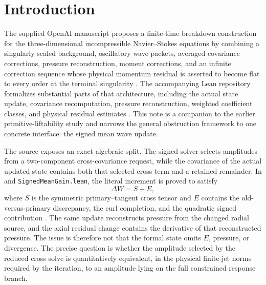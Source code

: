 \documentclass[12pt]{article}
\theoremstyle{plain}
\theoremstyle{definition}
\theoremstyle{remark}
\begin{document}
\tableofcontents
\newpage

\section{Introduction}\label{sec:introduction}
The supplied OpenAI manuscript proposes a finite-time breakdown construction for the three-dimensional incompressible Navier--Stokes equations by combining a singularly scaled background, oscillatory wave packets, averaged covariance corrections, pressure reconstruction, moment corrections, and an infinite correction sequence whose physical momentum residual is asserted to become flat to every order at the terminal singularity \cite[Secs.~3--10]{OpenAI2026}. The accompanying Lean repository formalizes substantial parts of that architecture, including the actual state update, covariance recomputation, pressure reconstruction, weighted coefficient classes, and physical residual estimates \cite{OpenAILeanRepo2026}. This note is a companion to the earlier primitive-liftability study and narrows the general obstruction framework to one concrete interface: the signed mean wave update.

The source exposes an exact algebraic split. The signed solver selects amplitudes from a two-component cross-covariance request, while the covariance of the actual updated state contains both that selected cross term and a retained remainder. In  and \texttt{SignedMeanGain.lean}, the literal increment is proved to satisfy
\[
\Delta W=S+E,
\]
where \(S\) is the symmetric primary--tangent cross tensor and \(E\) contains the old-versus-primary discrepancy, the curl completion, and the quadratic signed contribution \cite{OpenAILeanRepo2026}. The same update reconstructs pressure from the changed radial source, and the axial residual change contains the derivative of that reconstructed pressure. The issue is therefore not that the formal state omits \(E\), pressure, or divergence. The precise question is whether the amplitude selected by the reduced cross solve is quantitatively equivalent, in the physical finite-jet norms required by the iteration, to an amplitude lying on the full constrained response branch.
\end{document}
